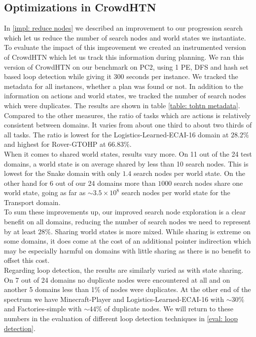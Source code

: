 \subsection{Optimizations in CrowdHTN}
\label{eval: crowd optimizations}
In \ref{impl: reduce nodes} we described an improvement to our progression search which let us reduce the number of search nodes and world states we instantiate. To evaluate the impact of this improvement we created an instrumented version of CrowdHTN which let us track this information during planning. We ran this version of CrowdHTN on our benchmark on PC2, using 1 PE, DFS and hash set based loop detection while giving it 300 seconds per instance. We tracked the metadata for all instances, whether a plan was found or not. In addition to the information on actions and world states, we tracked the number of search nodes which were duplicates. The results are shown in table \ref{table: tohtn metadata}. \\
Compared to the other measures, the ratio of tasks which are actions is relatively consistent between domains. It varies from about one third to about two thirds of all tasks. The ratio is lowest for the Logistics-Learned-ECAI-16 domain at $28.2\%$ and highest for Rover-GTOHP at $66.83\%$. \\
When it comes to shared world states, results vary more. On 11 out of the 24 test domains, a world state is on average shared by less than 10 search nodes. This is lowest for the Snake domain with only $1.4$ search nodes per world state. On the other hand for 6 out of our 24 domains more than $1000$ search nodes share one world state, going as far as $\sim3.5 \times 10^8$ search nodes per world state for the Transport domain. \\
To sum these improvements up, our improved search node exploration is a clear benefit on all domains, reducing the number of search nodes we need to represent by at least $28\%$. Sharing world states is more mixed. While sharing is extreme on some domains, it does come at the cost of an additional pointer indirection which may be especially harmful on domains with little sharing as there is no benefit to offset this cost. \\
Regarding loop detection, the results are similarly varied as with state sharing. On 7 out of 24 domains no duplicate nodes were encountered at all and on another 5 domains less than 1\% of nodes were duplicates. At the other end of the spectrum we have Minecraft-Player and Logistics-Learned-ECAI-16 with $\sim30\%$ and Factories-simple with $\sim44\%$ of duplicate nodes. We will return to these numbers in the evaluation of different loop detection techniques in \ref{eval: loop detection}.
